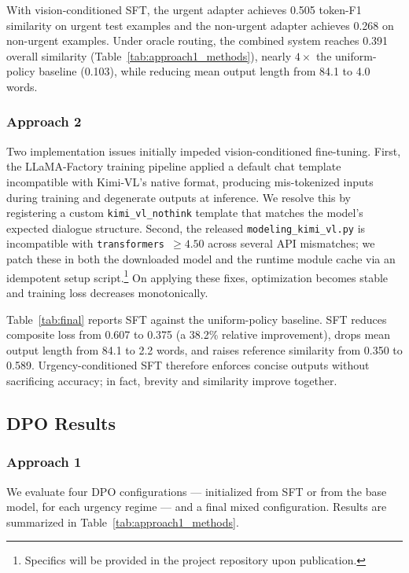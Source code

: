 \documentclass{article}
\begin{document}
With vision-conditioned SFT, the urgent adapter achieves 0.505 token-F1 similarity on urgent test examples and the non-urgent adapter achieves 0.268 on non-urgent examples. Under oracle routing, the combined system reaches 0.391 overall similarity (Table~\ref{tab:approach1_methods}), nearly $4\times$ the uniform-policy baseline (0.103), while reducing mean output length from 84.1 to 4.0 words.

\subsubsection{Approach 2}\label{sec:sft_approach2}
Two implementation issues initially impeded vision-conditioned fine-tuning. First, the LLaMA-Factory \cite{zheng2024llamafactory} training pipeline applied a default chat template incompatible with Kimi-VL's native format, producing mis-tokenized inputs during training and degenerate outputs at inference. We resolve this by registering a custom \texttt{kimi\_vl\_nothink} template that matches the model's expected dialogue structure. Second, the released \texttt{modeling\_kimi\_vl.py} is incompatible with \texttt{transformers}~$\geq 4.50$ across several API mismatches; we patch these in both the downloaded model and the runtime module cache via an idempotent setup script.\footnote{Specifics will be provided in the project repository upon publication.} On applying these fixes, optimization becomes stable and training loss decreases monotonically.

Table~\ref{tab:final} reports SFT against the uniform-policy baseline. SFT reduces composite loss from 0.607 to 0.375 (a 38.2\% relative improvement), drops mean output length from 84.1 to 2.2 words, and raises reference similarity from 0.350 to 0.589. Urgency-conditioned SFT therefore enforces concise outputs without sacrificing accuracy; in fact, brevity and similarity improve together.

\subsection{DPO Results}\label{sec:dpo_results}

\subsubsection{Approach 1}
We evaluate four DPO configurations --- initialized from SFT or from the base model, for each urgency regime --- and a final mixed configuration. Results are summarized in Table~\ref{tab:approach1_methods}.
\end{document}
